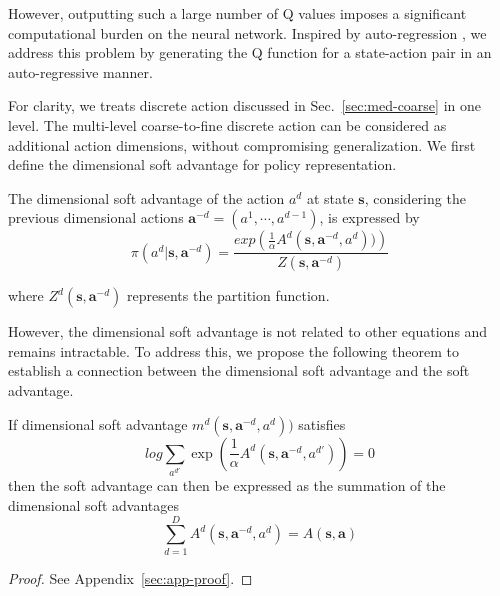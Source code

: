 However, outputting such a large number of Q values imposes a significant computational burden on the neural network.
Inspired by auto-regression \cite{GPT3}, we address this problem by generating the Q function for a state-action pair in an auto-regressive manner. 

For clarity, we treats discrete action discussed in Sec.~\ref{sec:med-coarse} in one level. 
The multi-level coarse-to-fine discrete action can be considered as additional action dimensions, without compromising generalization.
We first define the dimensional soft advantage for policy representation.

\begin{definition}
    The dimensional soft advantage of the action $a^d$ at state $\mathbf{s}$, considering the previous dimensional actions $\mathbf{a}^{-d} = (a^1, \cdots, a^{d-1})$, is expressed by
    \begin{equation}
    \label{eq:med-dsa}
        \pi (a^d | \mathbf{s}, \mathbf{a}^{-d}) = 
        \frac
        {exp \left( \frac{1}{\alpha} A^d(\mathbf{s}, \mathbf{a}^{-d}, a^d)) \right)}
        {Z(\mathbf{s}, \mathbf{a}^{-d})}
    \end{equation}
\end{definition}

where $Z^d(\mathbf{s}, \mathbf{a}^{-d})$ represents the partition function.

However, the dimensional soft advantage is not related to other equations and remains intractable. 
To address this, we propose the following theorem to establish a connection between the dimensional soft advantage and the soft advantage.

\begin{theorem}
\label{the:med-sum}
    If dimensional soft advantage $m^d(\mathbf{s}, \mathbf{a}^{-d}, a^d))$ satisfies
    \begin{equation}
    \label{eq:med-dsa-cond}
        log \sum_{a^{d'}} \exp{\left( \frac{1}{\alpha} A^d(\mathbf{s}, \mathbf{a}^{-d}, a^{d'}) \right)} = 0
    \end{equation}
    then the soft advantage can then be expressed as the summation of the dimensional soft advantages
    \begin{equation}
        \sum_{d=1}^D A^d(\mathbf{s}, \mathbf{a}^{-d}, a^d) = A(\mathbf{s}, \mathbf{a})
    \end{equation}
\end{theorem}
\begin{proof}
    See Appendix~\ref{sec:app-proof}.
\end{proof}

